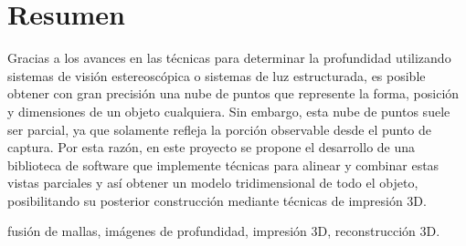 \chapter{Resumen}
Gracias a los avances en las técnicas para determinar la profundidad
utilizando sistemas de visión estereoscópica o sistemas de luz estructurada,
es posible obtener con gran precisión una nube de puntos que represente
la forma, posición y dimensiones de un objeto cualquiera.
Sin embargo, esta nube de puntos suele ser parcial, ya que solamente refleja
la porción observable desde el punto de captura.
Por esta razón, en este proyecto se propone el desarrollo de una biblioteca de software
que implemente técnicas para alinear y combinar estas vistas parciales
y así obtener un modelo tridimensional de todo el objeto,
posibilitando su posterior construcción mediante técnicas de impresión 3D.

 fusión de mallas, imágenes de profundidad, impresión 3D, reconstrucción 3D.
